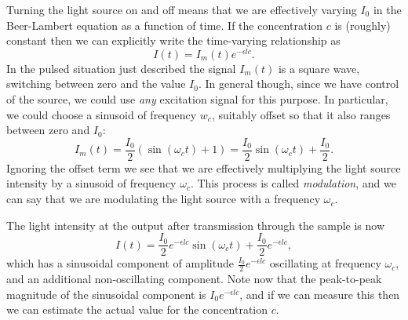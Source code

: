 \documentclass[10pt]{beamer}
\begin{document}
Turning the light source on and off means that we are effectively varying $I_0$ in the Beer-Lambert equation as a function of time.  If the concentration $c$ is (roughly) constant then we can explicitly  write the time-varying relationship as
\begin{equation*}
  I(t) = I_m(t) e^{-\epsilon l c}.
\end{equation*}
In the pulsed situation just described the signal $I_m(t)$ is a square wave, switching between zero and the value $I_0$.  In general though, since we have control of the source, we could use {\em any} excitation signal for this purpose.  In particular, we could choose a sinusoid of frequency $w_c$, suitably offset so that it also ranges between zero and $I_0$:
\begin{equation*}
  I_m(t) = \frac{I_0}{2} ( \sin(\omega_c t) + 1 ) = \frac{I_0}{2} \sin(\omega_c t) + \frac{I_0}{2}.
\end{equation*}
Ignoring the offset term we see that we are effectively multiplying the light source intensity by a sinusoid of frequency $\omega_c$.
This process is called {\em modulation}, and we can say that we are modulating the light source with a frequency $\omega_c$.

The light intensity at the output after transmission through the sample is now
\begin{equation*}
  I(t) = \frac{I_0}{2} e^{-\epsilon l c} \sin(\omega_c t) + \frac{I_0}{2} e^{-\epsilon l c},
\end{equation*}
which has a sinusoidal component of amplitude $\frac{I_0}{2} e^{-\epsilon l c}$ oscillating at frequency $\omega_c$, and an additional non-oscillating component.  Note now that the peak-to-peak magnitude of the sinusoidal component is $I_0 e^{-\epsilon l c}$, and if we can measure this then we can estimate the actual value for the concentration $c$.
\end{document}

